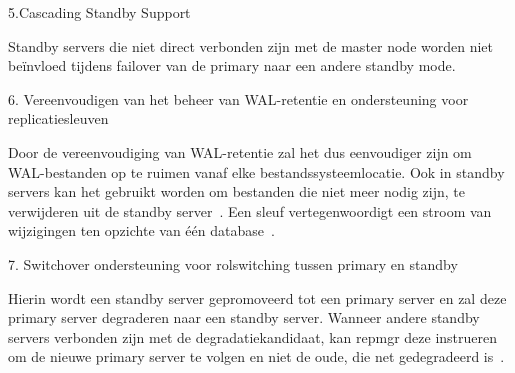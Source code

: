 5.Cascading Standby Support

Standby servers die niet direct verbonden zijn met de master node worden niet beïnvloed tijdens failover van de primary naar een andere standby mode.

6. Vereenvoudigen van het beheer van WAL-retentie en ondersteuning voor replicatiesleuven

Door de vereenvoudiging van WAL-retentie zal het dus eenvoudiger zijn om WAL-bestanden op te ruimen vanaf elke bestandssysteemlocatie. Ook in standby servers kan het gebruikt worden om bestanden die niet meer nodig zijn, te verwijderen uit de standby server~\autocite{Augustine2019}.
Een sleuf vertegenwoordigt een stroom van wijzigingen ten opzichte van één database~\autocite{Ranganathan2020}.

7. Switchover ondersteuning voor rolswitching tussen primary en standby

Hierin wordt een standby server gepromoveerd tot een primary server en zal deze primary server degraderen naar een standby server. Wanneer andere standby servers verbonden zijn met de degradatiekandidaat, kan repmgr deze instrueren om de nieuwe primary server te volgen en niet de oude, die net gedegradeerd is~\autocite{2021b}. %

